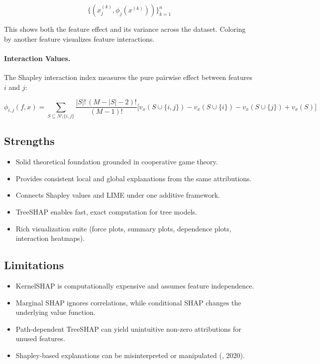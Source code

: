 \begin{equation}
\big\{ (x^{(k)}_j, \phi_j(x^{(k)})) \big\}_{k=1}^{n}
\end{equation}

This shows both the feature effect and its variance across the dataset.  
Coloring by another feature visualizes feature interactions.

\paragraph{Interaction Values.}
The Shapley interaction index measures the pure pairwise effect between features $i$ and $j$:

\begin{equation}
\phi_{i,j}(f, x) =
\sum_{S \subseteq N \setminus \{i,j\}}
\frac{|S|!\,(M-|S|-2)!}{(M-1)!}
\Big[
v_x(S \cup \{i,j\}) - v_x(S \cup \{i\}) - v_x(S \cup \{j\}) + v_x(S)
\Big]
\end{equation}

\subsection{Strengths}

\begin{itemize}
    \item Solid theoretical foundation grounded in cooperative game theory.
    \item Provides consistent local and global explanations from the same attributions.
    \item Connects Shapley values and LIME under one additive framework.
    \item TreeSHAP enables fast, exact computation for tree models.
    \item Rich visualization suite (force plots, summary plots, dependence plots, interaction heatmaps).
\end{itemize}

\subsection{Limitations}

\begin{itemize}
    \item KernelSHAP is computationally expensive and assumes feature independence.
    \item Marginal SHAP ignores correlations, while conditional SHAP changes the underlying value function.
    \item Path-dependent TreeSHAP can yield unintuitive non-zero attributions for unused features.
    \item Shapley-based explanations can be misinterpreted or manipulated (\citeauthor{Slack2020Fooling}, 2020).
\end{itemize}

